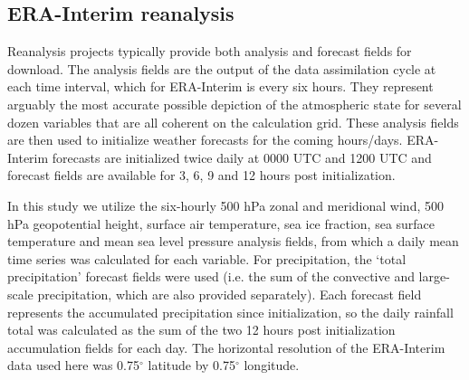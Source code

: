 \subsection{ERA-Interim reanalysis}

Reanalysis projects typically provide both analysis and forecast fields for download. The analysis fields are the output of the data assimilation cycle at each time interval, which for ERA-Interim is every six hours. They represent arguably the most accurate possible depiction of the atmospheric state for several dozen variables that are all coherent on the calculation grid. These analysis fields are then used to initialize weather forecasts for the coming hours/days. ERA-Interim forecasts are initialized twice daily at 0000 UTC and 1200 UTC and forecast fields are available for 3, 6, 9 and 12 hours post initialization.  

In this study we utilize the six-hourly 500 hPa zonal and meridional wind, 500 hPa geopotential height, surface air temperature, sea ice fraction, sea surface temperature and mean sea level pressure analysis fields, from which a daily mean time series was calculated for each variable. For precipitation, the `total precipitation' forecast fields were used (i.e. the sum of the convective and large-scale precipitation, which are also provided separately). Each forecast field represents the accumulated precipitation since initialization, so the daily rainfall total was calculated as the sum of the two 12 hours post initialization accumulation fields for each day. The horizontal resolution of the ERA-Interim data used here was 0.75$^{\circ}$ latitude by 0.75$^{\circ}$ longitude.   